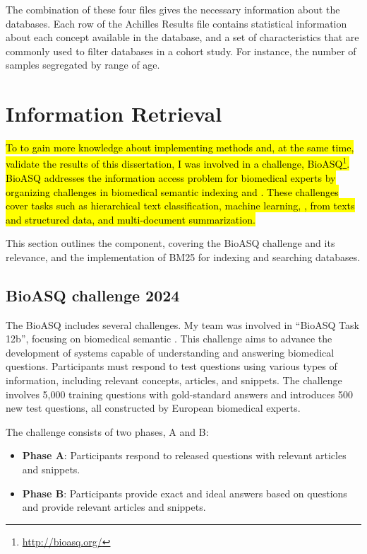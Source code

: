 \hspace{1cm}

The combination of these four files gives the necessary information about the databases. Each row of the Achilles Results file contains statistical information about each concept available in the database, and a set of characteristics that are commonly used to filter databases in a cohort study. For instance, the number of samples segregated by range of age. 


\section{Information Retrieval}

\hl{To to gain more knowledge about implementing {\ir} methods and, at the same time, validate the {\ir} results of this dissertation, I was involved in a challenge, BioASQ\footnote{\url{http://bioasq.org/}}. BioASQ addresses the information access problem for biomedical experts by organizing challenges in biomedical semantic indexing and {\qa}. These challenges cover tasks such as hierarchical text classification, machine learning, {\ir}, {\qa} from texts and structured data, and multi-document summarization.}

This section outlines the {\ir} component, covering the BioASQ challenge and its relevance, and the implementation of BM25 for indexing and searching databases.


\subsection{BioASQ challenge 2024}
\label{bioasq}

The BioASQ includes several challenges. My team was involved in ``BioASQ Task 12b'', focusing on biomedical semantic {\qa}. This challenge aims to advance the development of systems capable of understanding and answering biomedical questions. Participants must respond to test questions using various types of information, including relevant concepts, articles, and snippets. The challenge involves 5,000 training questions with gold-standard answers and introduces 500 new test questions, all constructed by European biomedical experts. 

The challenge consists of two phases, A and B:

\begin{itemize}
    \item \textbf{Phase A}: Participants respond to released questions with relevant articles and snippets.
    \item \textbf{Phase B}: Participants provide exact and ideal answers based on questions and provide relevant articles and snippets.
\end{itemize}

